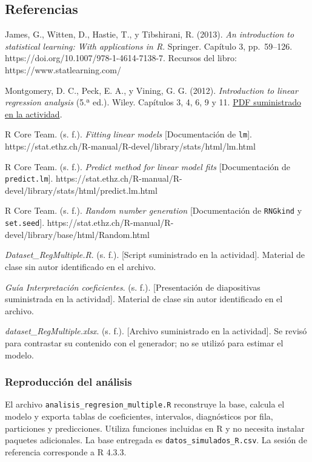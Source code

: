 \documentclass[
  11pt,
  letterpaper,
]{article}
\begin{document}
\newpage

\hypertarget{referencias}{%
\subsection{Referencias}\label{referencias}}

James, G., Witten, D., Hastie, T., y Tibshirani, R. (2013). \emph{An
introduction to statistical learning: With applications in R}. Springer.
Capítulo 3, pp.~59--126. https://doi.org/10.1007/978-1-4614-7138-7.
Recursos del libro: https://www.statlearning.com/

Montgomery, D. C., Peck, E. A., y Vining, G. G. (2012).
\emph{Introduction to linear regression analysis} (5.ª ed.). Wiley.
Capítulos 3, 4, 6, 9 y 11.
\href{https://www.kwcsangli.in/uploads/3--Introduction_to_Linear_Regression_Analysis__5th_ed._Douglas_C._Montgomery__Elizabeth_A._Peck__and_G._.pdf}{PDF
suministrado en la actividad}.

R Core Team. (s. f.). \emph{Fitting linear models} {[}Documentación de
\texttt{lm}{]}.
https://stat.ethz.ch/R-manual/R-devel/library/stats/html/lm.html

R Core Team. (s. f.). \emph{Predict method for linear model fits}
{[}Documentación de \texttt{predict.lm}{]}.
https://stat.ethz.ch/R-manual/R-devel/library/stats/html/predict.lm.html

R Core Team. (s. f.). \emph{Random number generation} {[}Documentación
de \texttt{RNGkind} y \texttt{set.seed}{]}.
https://stat.ethz.ch/R-manual/R-devel/library/base/html/Random.html

\emph{Dataset\_RegMultiple.R}. (s. f.). {[}Script suministrado en la
actividad{]}. Material de clase sin autor identificado en el archivo.

\emph{Guía Interpretación coeficientes}. (s. f.). {[}Presentación de
diapositivas suministrada en la actividad{]}. Material de clase sin
autor identificado en el archivo.

\emph{dataset\_RegMultiple.xlsx}. (s. f.). {[}Archivo suministrado en la
actividad{]}. Se revisó para contrastar su contenido con el generador;
no se utilizó para estimar el modelo.

\hypertarget{reproducciuxf3n-del-anuxe1lisis}{%
\subsubsection{Reproducción del
análisis}\label{reproducciuxf3n-del-anuxe1lisis}}

El archivo \texttt{analisis\_regresion\_multiple.R} reconstruye la base,
calcula el modelo y exporta tablas de coeficientes, intervalos,
diagnósticos por fila, particiones y predicciones. Utiliza funciones
incluidas en R y no necesita instalar paquetes adicionales. La base
entregada es \texttt{datos\_simulados\_R.csv}. La sesión de referencia
corresponde a R 4.3.3.
\end{document}
